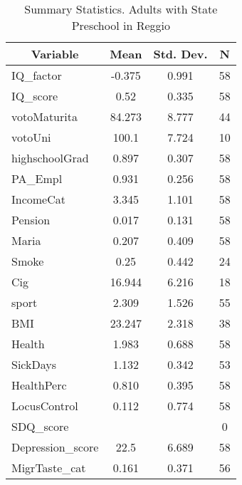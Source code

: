 
\begin{table}[htbp]\centering \caption{Summary Statistics. Adults with State Preschool in Reggio \label{bothAdultmaternaStatReggio}}
\begin{tabular}{l c c  c}\hline\hline
\multicolumn{1}{c}{\textbf{Variable}} & \textbf{Mean}
 & \textbf{Std. Dev.} & \textbf{N}\\ \hline
IQ\_factor & -0.375 & 0.991  & 58\\
IQ\_score & 0.52 & 0.335  & 58\\
votoMaturita & 84.273 & 8.777  & 44\\
votoUni & 100.1 & 7.724  & 10\\
highschoolGrad & 0.897 & 0.307  & 58\\
PA\_Empl & 0.931 & 0.256  & 58\\
IncomeCat & 3.345 & 1.101  & 58\\
Pension & 0.017 & 0.131  & 58\\
Maria & 0.207 & 0.409  & 58\\
Smoke & 0.25 & 0.442  & 24\\
Cig & 16.944 & 6.216  & 18\\
sport & 2.309 & 1.526  & 55\\
BMI & 23.247 & 2.318  & 38\\
Health & 1.983 & 0.688  & 58\\
SickDays & 1.132 & 0.342  & 53\\
HealthPerc & 0.810 & 0.395  & 58\\
LocusControl & 0.112 & 0.774  & 58\\
SDQ\_score &  &   & 0\\
Depression\_score & 22.5 & 6.689  & 58\\
MigrTaste\_cat & 0.161 & 0.371  & 56\\
\hline\end{tabular}
\end{table}
